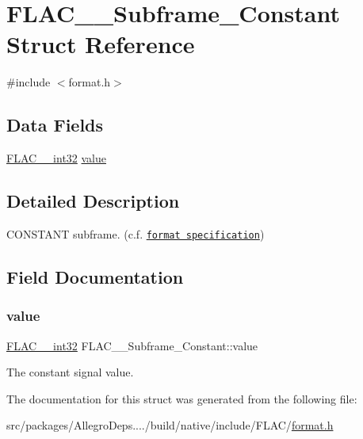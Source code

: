 \hypertarget{struct_f_l_a_c_____subframe___constant}{}\section{F\+L\+A\+C\+\_\+\+\_\+\+Subframe\+\_\+\+Constant Struct Reference}
\label{struct_f_l_a_c_____subframe___constant}


{\ttfamily \#include $<$format.\+h$>$}

\subsection*{Data Fields}
\begin{DoxyCompactItemize}
\item 
\hyperlink{ordinals_8h_a33fd77bfe6d685541a0c034a75deccdc}{F\+L\+A\+C\+\_\+\+\_\+int32} \hyperlink{struct_f_l_a_c_____subframe___constant_af1bcfcbb17f1e1edb115b002fdbaa70e}{value}
\end{DoxyCompactItemize}


\subsection{Detailed Description}
C\+O\+N\+S\+T\+A\+NT subframe. (c.\+f. \href{../format.html#subframe_constant}{\tt format specification}) 

\subsection{Field Documentation}
\mbox{\label{struct_f_l_a_c_____subframe___constant_af1bcfcbb17f1e1edb115b002fdbaa70e}} 
\subsubsection{\texorpdfstring{value}{value}}
{\footnotesize\ttfamily \hyperlink{ordinals_8h_a33fd77bfe6d685541a0c034a75deccdc}{F\+L\+A\+C\+\_\+\+\_\+int32} F\+L\+A\+C\+\_\+\+\_\+\+Subframe\+\_\+\+Constant\+::value}

The constant signal value. 

The documentation for this struct was generated from the following file\+:\begin{DoxyCompactItemize}
\item 
src/packages/\+Allegro\+Deps..../build/native/include/\+F\+L\+A\+C/\hyperlink{format_8h}{format.\+h}\end{DoxyCompactItemize}
